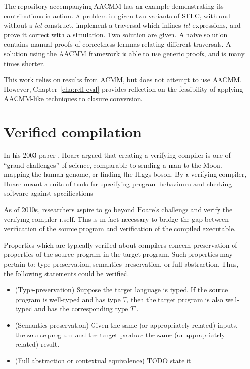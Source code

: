 \documentclass[bsc,frontabs,oneside,singlespacing,parskip,deptreport]{infthesis}
\theoremstyle{definition}
\theoremstyle{lemma}
\begin{document}
The repository accompanying AACMM has an example demonstrating its
contributions in action. A problem is: given two variants of STLC,
with and without a \textit{let} construct, implement a traversal which
inlines \textit{let} expressions, and prove it correct with a
simulation. Two solution are given. A naive solution contains manual
proofs of correctness lemmas relating different traversals. A solution
using the AACMM framework is able to use generic proofs, and is many
times shorter.

This work relies on results from ACMM, but does not attempt to use
AACMM. However, Chapter~\ref{cha:refl-eval} provides reflection on
the feasibility of applying AACMM-like techniques to closure conversion.

\section{Verified compilation}
\label{sec:verified-compilation}

In his 2003 paper \cite{hoare2003verifying}, Hoare argued that
creating a verifying compiler is one of ``grand challenges'' of
science, comparable to sending a man to the Moon, mapping the human
genome, or finding the Higgs boson. By a verifying compiler, Hoare
meant a suite of tools for specifying program behaviours and checking
software against specifications.

As of 2010s, researchers aspire to go beyond Hoare's challenge and
verify the verifying compiler itself. This is in fact necessary to
bridge the gap between verification of the source program and
verification of the compiled executable.

Properties which are typically verified about compilers concern
preservation of properties of the source program in the target
program. Such properties may pertain to: type preservation,
semantics preservation, or full abstraction. Thus, the following
statements could be verified.

\begin{itemize}
\item (Type-preservation) Suppose the target language is typed. If the
  source program is well-typed and has type $T$, then the target
  program is also well-typed and has the corresponding type $T'$.
\item (Semantics preservation) Given the same (or appropriately
  related) inputs, the source program and the target produce the same
  (or appropriately related) result.
\item (Full abstraction or contextual equivalence) TODO state it
\end{itemize}
\end{document}
